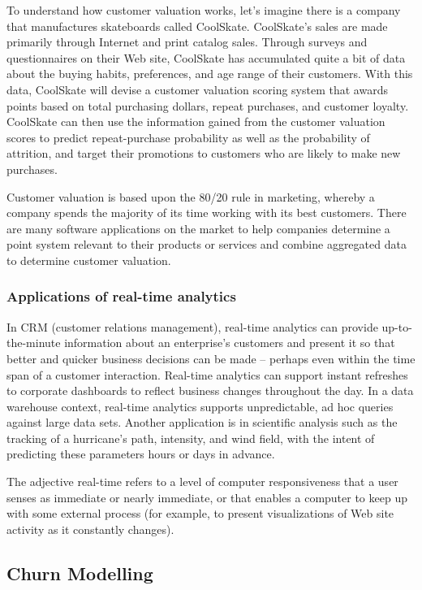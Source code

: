 \documentclass[12pt, a4paper]{report}
\theoremstyle{plain}
\theoremstyle{definition}
\theoremstyle{remark}
\begin{document}
To understand how customer valuation works, let's imagine there is a company that manufactures skateboards called CoolSkate. CoolSkate's sales are made primarily through Internet and print catalog sales. Through surveys and questionnaires on their Web site, CoolSkate has accumulated quite a bit of data about the buying habits, preferences, and age range of their customers. With this data, CoolSkate will devise a customer valuation scoring system that awards points based on total purchasing dollars, repeat purchases, and customer loyalty. CoolSkate can then use the information gained from the customer valuation scores to predict repeat-purchase probability as well as the probability of attrition, and target their promotions to customers who are likely to make new purchases.

Customer valuation is based upon the 80/20 rule in marketing, whereby a company spends the majority of its time working with its best customers. There are many software applications on the market to help companies determine a point system relevant to their products or services and combine aggregated data to determine customer valuation.



\subsubsection{Applications of real-time analytics}
In CRM (customer relations management), real-time analytics can provide up-to-the-minute information about an enterprise's customers and present it so that better and quicker business decisions can be made -- perhaps even within the time span of a customer interaction. Real-time analytics can support instant refreshes to corporate dashboards to reflect business changes throughout the day. In a data warehouse context, real-time analytics supports unpredictable, ad hoc queries against large data sets. Another application is in scientific analysis such as the tracking of a hurricane's path, intensity, and wind field, with the intent of predicting these parameters hours or days in advance.

The adjective real-time refers to a level of computer responsiveness that a user senses as immediate or nearly immediate, or that enables a computer to keep up with some external process (for example, to present visualizations of Web site activity as it constantly changes).

\subsection{Churn Modelling }
\end{document}
